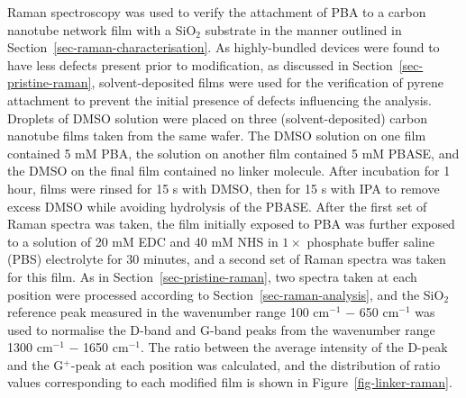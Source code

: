 \documentclass[
  a4paper,
]{scrbook}
\begin{document}
Raman spectroscopy was used to verify the attachment of PBA to a carbon
nanotube network film with a SiO\(_2\) substrate in the manner outlined
in Section~\ref{sec-raman-characterisation}. As highly-bundled devices
were found to have less defects present prior to modification, as
discussed in Section~\ref{sec-pristine-raman}, solvent-deposited films
were used for the verification of pyrene attachment to prevent the
initial presence of defects influencing the analysis. Droplets of DMSO
solution were placed on three (solvent-deposited) carbon nanotube films
taken from the same wafer. The DMSO solution on one film contained 5 mM
PBA, the solution on another film contained 5 mM PBASE, and the DMSO on
the final film contained no linker molecule. After incubation for 1
hour, films were rinsed for 15 s with DMSO, then for 15 s with IPA to
remove excess DMSO while avoiding hydrolysis of the PBASE. After the
first set of Raman spectra was taken, the film initially exposed to PBA
was further exposed to a solution of 20 mM EDC and 40 mM NHS in
\(1 \times\) phosphate buffer saline (PBS) electrolyte for 30 minutes,
and a second set of Raman spectra was taken for this film. As in
Section~\ref{sec-pristine-raman}, two spectra taken at each position
were processed according to Section~\ref{sec-raman-analysis}, and the
SiO\(_2\) reference peak measured in the wavenumber range 100
cm\(^{-1}\) \(-\) 650 cm\(^{-1}\) was used to normalise the D-band and
G-band peaks from the wavenumber range 1300 cm\(^{-1}\) \(-\) 1650
cm\(^{-1}\). The ratio between the average intensity of the D-peak and
the G\(^+\)-peak at each position was calculated, and the distribution
of ratio values corresponding to each modified film is shown in
Figure~\ref{fig-linker-raman}.
\end{document}

